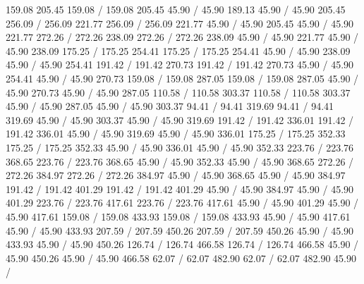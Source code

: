 { 159.08 205.45 159.08 /
 159.08 205.45 45.90 /
 45.90 189.13 45.90 /
\setsolid
{} 45.90 205.45 256.09 /
 256.09 221.77 256.09 /
 256.09 221.77 45.90 /
 45.90 205.45 45.90 /
\setsolid
{} 45.90 221.77 272.26 /
 272.26 238.09 272.26 /
 272.26 238.09 45.90 /
 45.90 221.77 45.90 /
\setsolid
{} 45.90 238.09 175.25 /
 175.25 254.41 175.25 /
 175.25 254.41 45.90 /
 45.90 238.09 45.90 /
\setsolid
{} 45.90 254.41 191.42 /
 191.42 270.73 191.42 /
 191.42 270.73 45.90 /
 45.90 254.41 45.90 /
\setsolid
{} 45.90 270.73 159.08 /
 159.08 287.05 159.08 /
 159.08 287.05 45.90 /
 45.90 270.73 45.90 /
\setsolid
{} 45.90 287.05 110.58 /
 110.58 303.37 110.58 /
 110.58 303.37 45.90 /
 45.90 287.05 45.90 /
\setsolid
{} 45.90 303.37 94.41 /
 94.41 319.69 94.41 /
 94.41 319.69 45.90 /
 45.90 303.37 45.90 /
\setsolid
{} 45.90 319.69 191.42 /
 191.42 336.01 191.42 /
 191.42 336.01 45.90 /
 45.90 319.69 45.90 /
\setsolid
{} 45.90 336.01 175.25 /
 175.25 352.33 175.25 /
 175.25 352.33 45.90 /
 45.90 336.01 45.90 /
\setsolid
{} 45.90 352.33 223.76 /
 223.76 368.65 223.76 /
 223.76 368.65 45.90 /
 45.90 352.33 45.90 /
\setsolid
{} 45.90 368.65 272.26 /
 272.26 384.97 272.26 /
 272.26 384.97 45.90 /
 45.90 368.65 45.90 /
\setsolid
{} 45.90 384.97 191.42 /
 191.42 401.29 191.42 /
 191.42 401.29 45.90 /
 45.90 384.97 45.90 /
\setsolid
{} 45.90 401.29 223.76 /
 223.76 417.61 223.76 /
 223.76 417.61 45.90 /
 45.90 401.29 45.90 /
\setsolid
{} 45.90 417.61 159.08 /
 159.08 433.93 159.08 /
 159.08 433.93 45.90 /
 45.90 417.61 45.90 /
\setsolid
{} 45.90 433.93 207.59 /
 207.59 450.26 207.59 /
 207.59 450.26 45.90 /
 45.90 433.93 45.90 /
\setsolid
{} 45.90 450.26 126.74 /
 126.74 466.58 126.74 /
 126.74 466.58 45.90 /
 45.90 450.26 45.90 /
\setsolid
{} 45.90 466.58 62.07 /
 62.07 482.90 62.07 /
 62.07 482.90 45.90 /
}
